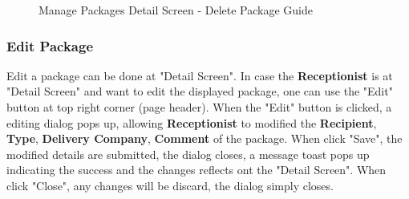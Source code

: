\begin{figure}[H]
	\centering
    \vspace{5pt}
    \vspace{10pt}
    \vspace{10pt}
    \caption{Manage Packages Detail Screen - Delete Package Guide}
	\label{fig:MPReportDeleteBtn}
\end{figure}

\subsubsection{Edit Package}

Edit a package can be done at "Detail Screen".
In case the \textbf{Receptionist} is at "Detail Screen" and want to edit the displayed package, one can use the "Edit" button at top right corner (page header). 
When the "Edit" button is clicked, a editing dialog pops up, allowing \textbf{Receptionist} to modified the \textbf{Recipient}, \textbf{Type}, \textbf{Delivery Company}, \textbf{Comment} of the package. 
When click "Save", the modified details are submitted, the dialog closes, a message toast pops up indicating the success and the changes reflects ont the "Detail Screen". When click "Close", any changes will be discard, the dialog simply closes.

